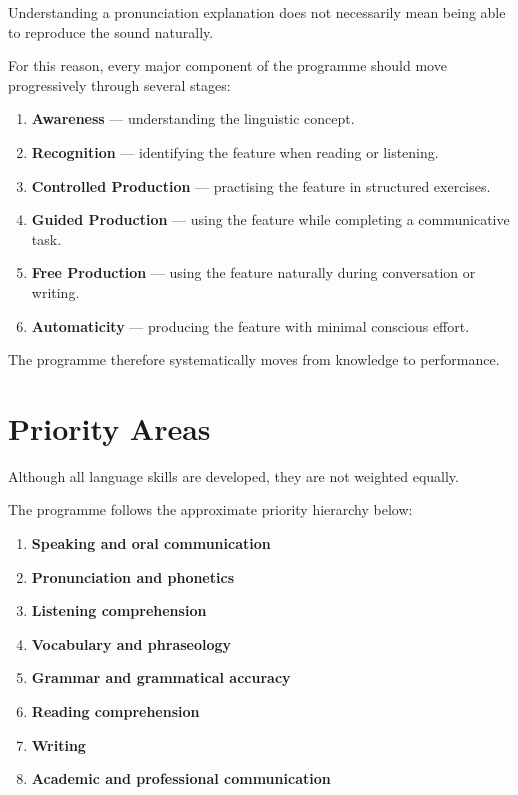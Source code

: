 Understanding a pronunciation explanation does not necessarily mean being able to reproduce the sound naturally.

For this reason, every major component of the programme should move progressively through several stages:

\begin{enumerate}
    \item \textbf{Awareness} --- understanding the linguistic concept.
    
    \item \textbf{Recognition} --- identifying the feature when reading or listening.
    
    \item \textbf{Controlled Production} --- practising the feature in structured exercises.
    
    \item \textbf{Guided Production} --- using the feature while completing a communicative task.
    
    \item \textbf{Free Production} --- using the feature naturally during conversation or writing.
    
    \item \textbf{Automaticity} --- producing the feature with minimal conscious effort.
\end{enumerate}

The programme therefore systematically moves from knowledge to performance.

\section*{Priority Areas}

Although all language skills are developed, they are not weighted equally.

The programme follows the approximate priority hierarchy below:

\begin{enumerate}
    \item \textbf{Speaking and oral communication}
    \item \textbf{Pronunciation and phonetics}
    \item \textbf{Listening comprehension}
    \item \textbf{Vocabulary and phraseology}
    \item \textbf{Grammar and grammatical accuracy}
    \item \textbf{Reading comprehension}
    \item \textbf{Writing}
    \item \textbf{Academic and professional communication}
\end{enumerate}

